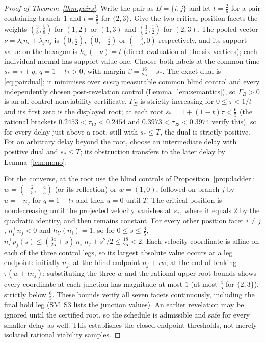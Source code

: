 \documentclass[11pt,a4paper]{article}
\theoremstyle{plain}
\theoremstyle{definition}
\theoremstyle{remark}
\newcommand{\tfr}[2]{\tfrac{#1}{#2}}
\begin{document}
\begin{proof}[Proof of Theorem~\ref{thm:pairs}]
Write the pair as $B=\{i,j\}$ and let $t=\tfr25$ for a pair containing branch~1 and $t=\tfr35$ for $\{2,3\}$. Give the two critical position facets the weights $(\tfr38,\tfr58)$ for $(1,2)$ or $(1,3)$ and $(\tfr12,\tfr12)$ for $(2,3)$. The pooled vector $\nu=\lambda_in_i+\lambda_jn_j$ is $(0,\tfr12)$, $(0,-\tfr12)$ or $(-\tfr35,0)$ respectively, and its support value on the hexagon is $h_U(-\nu)=t$ (direct evaluation at the six vertices); each individual normal has support value one. Choose both labels at the common time $s_\ast=\tau+q$, $q=1-t\tau>0$, with margin $\beta=\tfr{16}{25}-s_\ast$. The exact dual is \eqref{eq:pairdual}; it minimises over \emph{every} measurable common blind control and every independently chosen post-revelation control (Lemma~\ref{lem:semantics}), so $\Gamma_B>0$ is an all-control nonviability certificate. $\Gamma_B$ is strictly increasing for $0\le\tau<1/t$ and its first zero is the displayed root; at each root $s_\ast=1+(1-t)\tau<\tfr65$ (the rational brackets $0.2453<\tau_{12}<0.2454$ and $0.3973<\tau_{23}<0.3974$ verify this), so for every delay just above a root, still with $s_\ast\le T$, the dual is strictly positive. For an arbitrary delay beyond the root, choose an intermediate delay with positive dual and $s_\ast\le T$; its obstruction transfers to the later delay by Lemma~\ref{lem:mono}.

For the converse, at the root use the blind controls of Proposition~\ref{prop:ladder}: $w=(-\tfr25,-\tfr45)$ (or its reflection) or $w=(1,0)$, followed on branch $j$ by $u=-n_j$ for $q=1-t\tau$ and then $u=0$ until $T$. The critical position is nondecreasing until the projected velocity vanishes at $s_\ast$, where it equals $2$ by the quadratic identity, and then remains constant. For every other position facet $i\ne j$, $n_i^\top n_j<0$ and $h_U(n_i)=1$, so for $0\le s\le\tfr65$, $n_i^\top p_j(s)\le(\tfr{34}{25}+s)\,n_i^\top n_j+s^2/2\le\tfr{18}{25}<2$. Each velocity coordinate is affine on each of the three control legs, so its largest absolute value occurs at a leg endpoint: initially $n_j$, at the blind endpoint $n_j+\tau w$, at the end of braking $\tau(w+tn_j)$; substituting the three $w$ and the rational upper root bounds shows every coordinate at each junction has magnitude at most $1$ (at most $\tfr45$ for $\{2,3\}$), strictly below $\tfr65$. These bounds verify all seven facets continuously, including the final hold leg (SM~S3 lists the junction values). An earlier revelation may be ignored until the certified root, so the schedule is admissible and safe for every smaller delay as well. This establishes the closed-endpoint thresholds, not merely isolated rational viability samples.
\end{proof}
\end{document}
